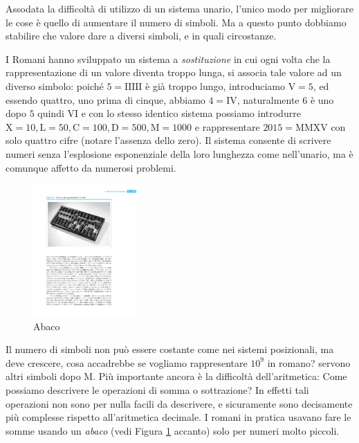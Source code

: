 {Assodata la difficoltà di utilizzo di un sistema unario, l'unico modo per
migliorare le cose è quello di aumentare il numero di simboli. Ma a questo
punto dobbiamo stabilire che valore dare a diversi simboli, e in quali
circostanze.

I Romani hanno sviluppato un sistema a
\emph{sostituzione} in cui ogni volta che la rappresentazione di un valore
diventa troppo lunga, si associa tale valore ad un diverso simbolo: poiché $5 =
\mathrm{IIIII}$ è già troppo lungo, introduciamo $\mathrm{V} = 5$, ed essendo
quattro, uno prima di cinque, abbiamo $4 = \mathrm{IV}$, naturalmente $6$ è uno
dopo $5$ quindi $\mathrm{VI}$ e con lo stesso identico sistema possiamo
introdurre $\mathrm{X} = 10, \mathrm{L} = 50, \mathrm{C} = 100, \mathrm{D} =
500, \mathrm{M} = 1000$ e rappresentare $2015 = \mathrm{MMXV}$ con solo quattro
cifre (notare l'assenza dello zero). Il sistema consente di scrivere numeri
senza l'esplosione esponenziale della loro lunghezza come nell'unario, ma è
comunque affetto da numerosi problemi.

\begin{figure}
\vspace{-2ex}
\captionsetup{font=small}
\centering \includegraphics[width=4cm]{abaco.pdf}
\caption{Abaco}\label{fig:abaco}
\end{figure}
Il numero di simboli non può essere costante come nei sistemi posizionali, ma
deve crescere, cosa accadrebbe se vogliamo rappresentare $10^9$ in romano?
servono altri simboli dopo $\mathrm{M}$. Più importante ancora è la difficoltà
dell'aritmetica: Come possiamo descrivere le operazioni di somma o sottrazione?
In effetti tali operazioni non sono per nulla facili da descrivere, e
sicuramente sono decisamente più complesse rispetto all'aritmetica decimale. I
romani in pratica usavano fare le somme usando un \emph{abaco} (vedi Figura \ref{fig:abaco} accanto) 
solo per numeri molto piccoli.

}
